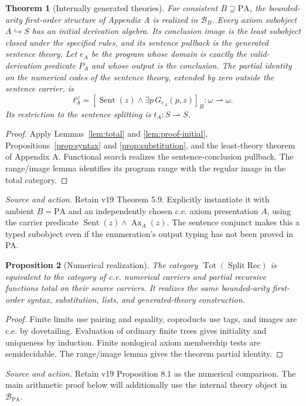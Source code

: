 \documentclass[11pt]{article}
\newtheorem{theorem}{Theorem}[section]
\newtheorem{proposition}[theorem]{Proposition}
\theoremstyle{definition}\newtheorem{definition}[theorem]{Definition}
\newcommand{\PA}{\mathrm{PA}}
\newcommand{\Tot}{\operatorname{Tot}}
\newcommand{\Split}{\operatorname{Split}}
\newcommand{\Sent}{\operatorname{Sent}}
\newcommand{\B}{\mathcal B}
\newcommand{\source}[1]{\par\smallskip\noindent\textit{Source and action.} #1\par\smallskip}
\begin{document}
\begin{theorem}[Internally generated theories]\label{thm:internal}
For consistent $B\supseteq\PA$, the bounded-arity first-order
structure of Appendix A is realized in $\B_B$. Every axiom
subobject $A\hookrightarrow S$ has an initial derivation algebra.
Its conclusion image is the least subobject closed under the
specified rules, and its sentence pullback is the generated sentence
theory. Let $e_A$ be the program whose domain is exactly the
valid-derivation predicate $P_A$ and whose output is the conclusion.
The partial identity on the numerical codes of the sentence theory,
extended by zero outside the sentence carrier, is
\[
 t_A^{\omega}=[\Sent(z)\land\exists p\,G_{e_A}(p,z)]_B:
 \omega\rightharpoonup\omega.
\]
Its restriction to the sentence splitting is
$t_A:S\rightharpoonup S$.
\end{theorem}
\begin{proof}
Apply Lemmas~\ref{lem:total} and \ref{lem:proof-initial},
Propositions~\ref{prop:syntax} and \ref{prop:substitution}, and the
least-theory theorem of Appendix A. Functional search realizes the
sentence-conclusion pullback. The range/image lemma identifies its
program range with the regular image in the total category.
\end{proof}
\source{Retain v19 Theorem 5.9. Explicitly instantiate it with ambient $B=\PA$ and an independently chosen c.e. axiom presentation $A$, using the carrier predicate $\Sent(z)\land\operatorname{Ax}_A(z)$. The sentence conjunct makes this a typed subobject even if the enumeration's output typing has not been proved in PA.}

\begin{proposition}[Numerical realization]\label{prop:rec-realization}
The category $\Tot(\Split\mathrm{Rec})$ is equivalent to the category
of c.e. numerical carriers and partial recursive functions total on
their source carriers. It realizes the same bounded-arity first-order
syntax, substitution, lists, and generated-theory construction.
\end{proposition}
\begin{proof}
Finite limits use pairing and equality, coproducts use tags, and
images are c.e. by dovetailing. Evaluation of ordinary finite trees
gives initiality and uniqueness by induction. Finite nonlogical
axiom membership tests are semidecidable. The range/image lemma gives
the theorem partial identity.
\end{proof}
\source{Retain v19 Proposition 8.1 as the numerical comparison. The main arithmetic proof below will additionally use the internal theory object in $\B_{\PA}$.}
\end{document}
